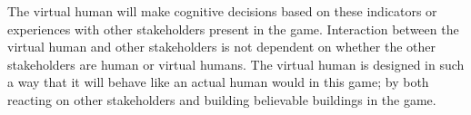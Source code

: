 The virtual human will make cognitive decisions based on these indicators or experiences with other stakeholders present in the game. Interaction between the virtual human and other stakeholders is not dependent on whether the other stakeholders are human or virtual humans. The virtual human is designed in such a way that it will behave like an actual human would in this game; by both reacting on other stakeholders and building believable buildings in the game.

